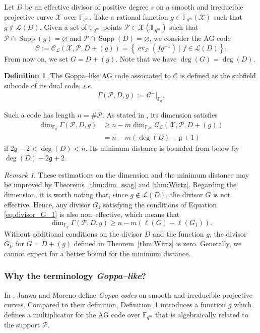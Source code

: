 \documentclass[lettersize,journal]{IEEEtran}
\theoremstyle{plain}
\theoremstyle{definition}
\newtheorem{definition}[thm]{Definition}
\theoremstyle{remark}
\newtheorem{remark}[thm]{Remark}
\DeclareMathOperator{\ev}{ev}
\newcommand{\calP}{\mathcal{P}}
\newcommand{\calL}{\mathcal{L}}
\newcommand{\calC}{\mathcal{C}}
\newcommand{\calX}{\mathcal{X}}
\newcommand{\fqm}{\mathbb{F}_{q^m}}
\newcommand{\fq}{\mathbb{F}_{q}}
\newcommand{\set}[1]{\left\{#1\right\}}
\newcommand{\Supp}{\operatorname{Supp}}
\begin{document}
	Let $D$ be an effective divisor of positive degree $s$ on a smooth and irreducible projective curve $\calX$ over $\fqm$. Take a rational function $g \in \fqm(\calX)$ such that $g \notin \calL(D)$. Given a set of $\fqm$--points $\calP \in \calX(\fqm)$ such that $\calP \cap \Supp(g) = \varnothing$ and $\calP \cap \Supp(D) = \varnothing$, we consider the AG code
	\[\calC := \calC_{\calL}(\calX,\calP,D+(g))=\set{\ev_{\calP}(fg^{-1}) \mid f \in \calL(D)}.\]
	From now on, we set $G=D+(g)$. Note that we have $\deg(G)=\deg(D)$.
	\begin{definition} \label{def:Goppa--like_AG_code}
		The Goppa--like AG code associated to $\calC$ is defined as the subfield subcode of its dual code, \emph{i.e.}
		\[ \Gamma(\calP,D,g) := \calC^{\perp}|_{\fq}.\]
	\end{definition}%
	Such a code has length $n = \# \calP$. As stated in \cite[Theorem~1]{JM96}, its dimension satisfies 
	\[\begin{aligned}
		\dim_{\fq} \Gamma(\calP,D,g) 	&\geq n-m \dim_{\fqm} \calC_{\calL}(\calX,\calP,D+(g)) \\
										&=n-m(\deg (D) - \mathfrak{g} +1 )
	\end{aligned}\]
	if $2\mathfrak{g} - 2 < \deg (D) < n$. Its minimum distance is bounded from below by $\deg (D) - 2 \mathfrak{g} + 2$.
	
	\begin{remark}
		These estimations on the dimension and the minimum distance may be improved by Theorems~\ref{thm:dim_ssag} and \ref{thm:Wirtz}. Regarding the dimension, it is worth noting that, since $g \notin \calL(D)$, the divisor $G$ is not effective. Hence, any divisor $G_1$ satisfying the conditions of Equation \eqref{eq:divisor_G_1} is also non--effective, which means that
		\[	\dim_{\fq}  \Gamma(\calP,D,g) \geq 	n-m\left(\ell(G) - \ell(G_1)\right). \]
		Without additional conditions on the divisor $D$ and the function $g$, the divisor $G_U$ for $G=D+(g)$ defined in Theorem~\ref{thm:Wirtz} is zero. Generally, we cannot expect for a better bound for the minimum distance. 
	\end{remark}
	
	
	
	\subsubsection{Why the terminology \textit{Goppa--like}?}
	
	In \cite{JM96}, Janwa and Moreno define \emph{Goppa codes} on smooth and irreducible projective curves. Compared to their definition, Definition~\ref{def:Goppa--like_AG_code} introduces a function $g$ which defines a multiplicator for the AG code over $\fqm$ that is algebraically related to the support $\calP$.
	
\end{document}
